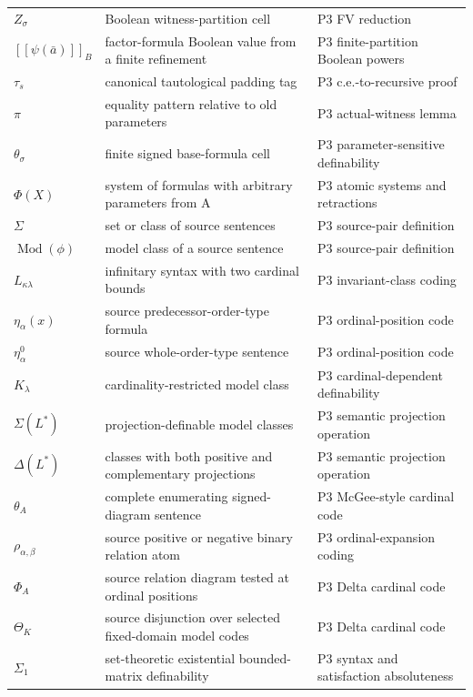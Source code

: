 \begin{longtable}{@{}p{}p{}p{}@{}}
\(Z_\sigma\) & Boolean witness-partition cell & P3 FV reduction \\
\([\![\psi(\bar a)]\!]_B\) & factor-formula Boolean value from a finite refinement & P3 finite-\allowbreak{}partition Boolean powers \\
\(\tau_s\) & canonical tautological padding tag & P3 c.\allowbreak{}e.-\allowbreak{}to-\allowbreak{}recursive proof \\
\(\pi\) & equality pattern relative to old parameters & P3 actual-\allowbreak{}witness lemma \\
\(\theta_\sigma\) & finite signed base-formula cell & P3 parameter-\allowbreak{}sensitive definability \\
\(\Phi(X)\) & system of formulas with arbitrary parameters from A & P3 atomic systems and retractions \\
\(\Sigma\) & set or class of source sentences & P3 source-\allowbreak{}pair definition \\
\(\operatorname{Mod}(\phi)\) & model class of a source sentence & P3 source-\allowbreak{}pair definition \\
\(L_{\kappa\lambda}\) & infinitary syntax with two cardinal bounds & P3 invariant-\allowbreak{}class coding \\
\(\eta_\alpha(x)\) & source predecessor-order-type formula & P3 ordinal-\allowbreak{}position code \\
\(\eta^0_\alpha\) & source whole-order-type sentence & P3 ordinal-\allowbreak{}position code \\
\(K_\lambda\) & cardinality-restricted model class & P3 cardinal-\allowbreak{}dependent definability \\
\(\Sigma(L^*)\) & projection-definable model classes & P3 semantic projection operation \\
\(\Delta(L^*)\) & classes with both positive and complementary projections & P3 semantic projection operation \\
\(\theta_A\) & complete enumerating signed-diagram sentence & P3 McGee-\allowbreak{}style cardinal code \\
\(\rho_{\alpha,\beta}\) & source positive or negative binary relation atom & P3 ordinal-\allowbreak{}expansion coding \\
\(\Phi_A\) & source relation diagram tested at ordinal positions & P3 Delta cardinal code \\
\(\Theta_K\) & source disjunction over selected fixed-domain model codes & P3 Delta cardinal code \\
\(\Sigma_1\) & set-theoretic existential bounded-matrix definability & P3 syntax and satisfaction absoluteness \\

\end{longtable}
